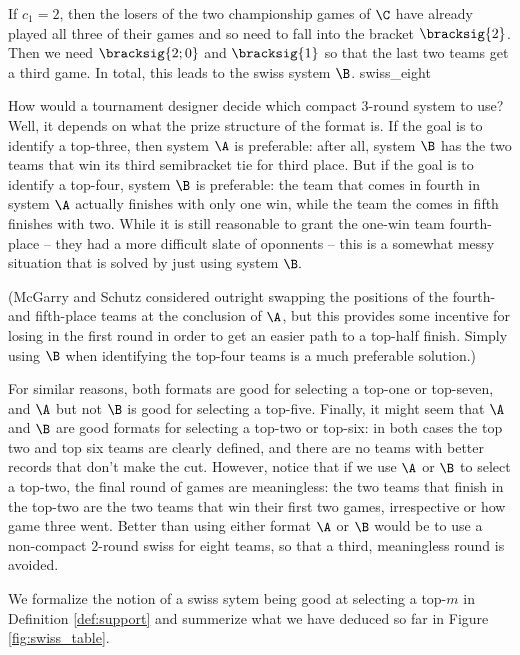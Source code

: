 {{        If $c_1 = 2$, then the losers of the two championship games of $\C$ have already played all three of their games and so need to fall into the bracket $\bracksig{2}$. Then we need $\bracksig{2;0}$ and $\bracksig{1}$ so that the last two teams get a third game. In total, this leads to the swiss system $\B$.
    }{swiss_eight}


    How would a tournament designer decide which compact 3-round system to use? Well, it depends on what the prize structure of the format is. If the goal is to identify a top-three, then system $\A$ is preferable: after all, system $\B$ has the two teams that win its third semibracket tie for third place. But if the goal is to identify a top-four, system $\B$ is preferable: the team that comes in fourth in system $\A$ actually finishes with only one win, while the team the comes in fifth finishes with two. While it is still reasonable to grant the one-win team fourth-place -- they had a more difficult slate of oponnents -- this is a somewhat messy situation that is solved by just using system $\B.$
    
    (McGarry and Schutz \cite{four_five_swap} considered outright swapping the positions of the fourth- and fifth-place teams at the conclusion of $\A$, but this provides some incentive for losing in the first round in order to get an easier path to a top-half finish. Simply using $\B$ when identifying the top-four teams is a much preferable solution.)

    For similar reasons, both formats are good for selecting a top-one or top-seven, and $\A$ but not $\B$ is good for selecting a top-five. Finally, it might seem that $\A$ and $\B$ are good formats for selecting a top-two or top-six: in both cases the top two and top six teams are clearly defined, and there are no teams with better records that don't make the cut. However, notice that if we use $\A$ or $\B$ to select a top-two, the final round of games are meaningless: the two teams that finish in the top-two are the two teams that win their first two games, irrespective or how game three went. Better than using either format $\A$ or $\B$ would be to use a non-compact $2$-round swiss for eight teams, so that a third, meaningless round is avoided.
    
    We formalize the notion of a swiss sytem being good at selecting a top-$m$ in Definition \ref{def:support} and summerize what we have deduced so far in Figure \ref{fig:swiss_table}.

}
